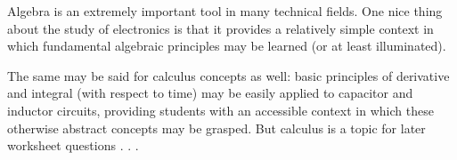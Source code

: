 





Algebra is an extremely important tool in many technical fields.  One nice thing about the study of electronics is that it provides a relatively simple context in which fundamental algebraic principles may be learned (or at least illuminated).  

The same may be said for calculus concepts as well: basic principles of derivative and integral (with respect to time) may be easily applied to capacitor and inductor circuits, providing students with an accessible context in which these otherwise abstract concepts may be grasped.  But calculus is a topic for later worksheet questions . . .




